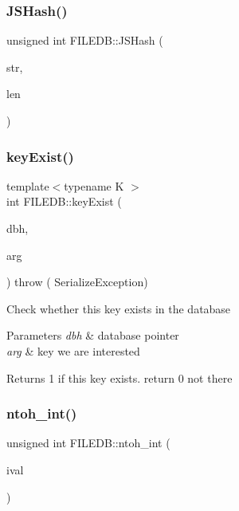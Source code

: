 \subsubsection{\texorpdfstring{JSHash()}{JSHash()}}
{\footnotesize\ttfamily unsigned int F\+I\+L\+E\+D\+B\+::\+J\+S\+Hash (\begin{DoxyParamCaption}\item[{char $\ast$}]{str,  }\item[{unsigned int}]{len }\end{DoxyParamCaption})}

\mbox{\label{namespaceFILEDB_a693e2659d01ea18edb88d796d7cbd5de}} 
\subsubsection{\texorpdfstring{keyExist()}{keyExist()}}
{\footnotesize\ttfamily template$<$typename K $>$ \\
int F\+I\+L\+E\+D\+B\+::key\+Exist (\begin{DoxyParamCaption}\item[{\mbox{\hyperlink{adat-devel_2other__libs_2filedb_2filehash_2ffdb__db_8h_a0b27b956926453a7a8141ea8e10f0df8}{F\+F\+D\+B\+\_\+\+DB}} $\ast$}]{dbh,  }\item[{const K \&}]{arg }\end{DoxyParamCaption}) throw ( Serialize\+Exception) }

Check whether this key exists in the database


\begin{DoxyParams}{Parameters}
{\em dbh} & database pointer \\
\hline
{\em arg} & key we are interested\\
\hline
\end{DoxyParams}
\begin{DoxyReturn}{Returns}
1 if this key exists. return 0 not there 
\end{DoxyReturn}
\mbox{\label{namespaceFILEDB_ab34ff6954f1b3a0dc868119d34105579}} 
\subsubsection{\texorpdfstring{ntoh\_int()}{ntoh\_int()}}
{\footnotesize\ttfamily unsigned int F\+I\+L\+E\+D\+B\+::ntoh\+\_\+int (\begin{DoxyParamCaption}\item[{unsigned int}]{ival }\end{DoxyParamCaption})}

